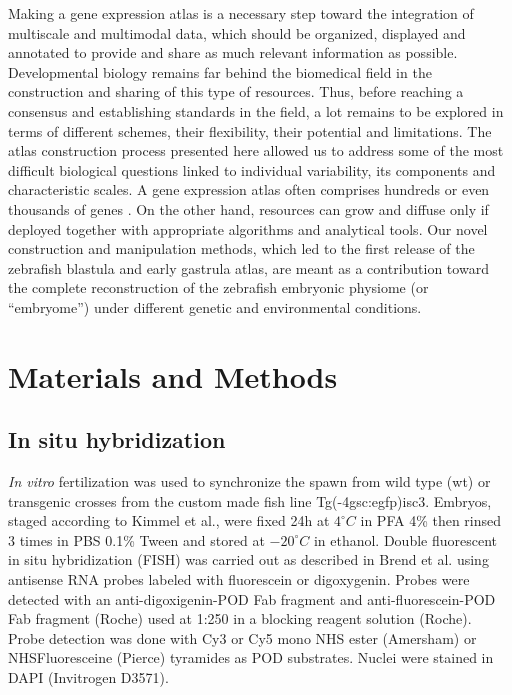 Making a gene expression atlas is a necessary step toward the integration of multiscale and multimodal data, which should be organized, displayed and annotated to provide and share as much relevant information as possible. Developmental biology remains far behind the biomedical field in the construction and sharing of this type of resources. Thus, before reaching a consensus and establishing standards in the field, a lot remains to be explored in terms of different schemes, their flexibility, their potential and limitations. The atlas construction process presented here allowed us to address some of the most difficult biological questions linked to individual variability, its components and characteristic scales. A gene expression atlas often comprises hundreds or even thousands of genes \cite{de2009more}. On the other hand, resources can grow and diffuse only if deployed together with appropriate algorithms and analytical tools. Our novel construction and manipulation methods, which led to the first release of the zebrafish blastula and early gastrula atlas, are meant as a contribution toward the complete reconstruction of the zebrafish embryonic physiome (or ``embryome'') under different genetic and environmental conditions.

\section*{Materials and Methods}

\subsection*{In situ hybridization}
\label{subsec:imaging}

\emph{In vitro} fertilization was used to synchronize the spawn from wild type (wt) or transgenic crosses from the custom made fish line Tg(-4gsc:egfp)isc3. Embryos, staged according to Kimmel et al.\cite{kimmel1995stages}, were fixed 24h at $4^{\circ} C$ in PFA 4\% then rinsed 3 times in PBS 0.1\% Tween and stored at $-20^{\circ} C$ in ethanol. Double fluorescent in situ hybridization (FISH) was carried out as described in Brend et al.\cite{brend2009zebrafish} using antisense RNA probes labeled with fluorescein or digoxygenin. Probes were detected with an anti-digoxigenin-POD Fab fragment and anti-fluorescein-POD Fab fragment (Roche) used at 1:250 in a blocking reagent solution (Roche). Probe detection was done with Cy3 or Cy5 mono NHS ester (Amersham) or NHSFluoresceine (Pierce) tyramides as POD substrates. Nuclei were stained in DAPI (Invitrogen D3571).

